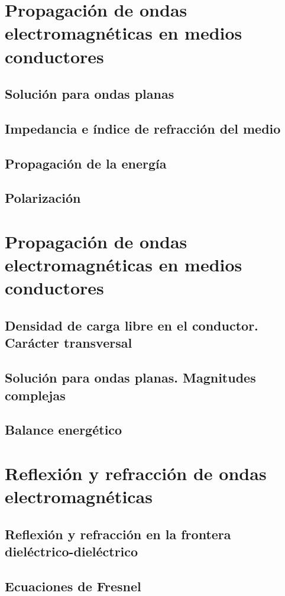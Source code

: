 \documentclass[a4paper]{book}
\begin{document}
\chapter{Propagación de ondas electromagnéticas en medios conductores}
\section{Solución para ondas planas}
\section{Impedancia e índice de refracción del medio}
\section{Propagación de la energía}
\section{Polarización}

\chapter{Propagación de ondas electromagnéticas en medios conductores}
\section{Densidad de carga libre en el conductor. Carácter transversal}
\section{Solución para ondas planas. Magnitudes complejas}
\section{Balance energético}

\chapter{Reflexión y refracción de ondas electromagnéticas}
\section[Reflexión y refracción en la frontera dieléctrico-dieléctrico]{Reflexión y refracción en la frontera\\ dieléctrico-dieléctrico}
\section{Ecuaciones de Fresnel}
\end{document}
